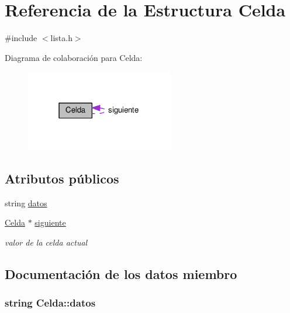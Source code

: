 \hypertarget{struct_celda}{}\section{Referencia de la Estructura Celda}
\label{struct_celda}


{\ttfamily \#include $<$lista.\+h$>$}



Diagrama de colaboración para Celda\+:
\nopagebreak
\begin{figure}[H]
\begin{center}
\leavevmode
\includegraphics[width=183pt]{struct_celda__coll__graph}
\end{center}
\end{figure}
\subsection*{Atributos públicos}
\begin{DoxyCompactItemize}
\item 
string \hyperlink{struct_celda_aef12ed8e6d15d140a516c259cdcbf634}{datos}
\item 
\hyperlink{struct_celda}{Celda} $\ast$ \hyperlink{struct_celda_a5c6d6d20b0c0b0a359715844955a0078}{siguiente}
\begin{DoxyCompactList}\small\item\em valor de la celda actual \end{DoxyCompactList}\end{DoxyCompactItemize}


\subsection{Documentación de los datos miembro}
\hypertarget{struct_celda_aef12ed8e6d15d140a516c259cdcbf634}{}
\subsubsection[{datos}]{\setlength{\rightskip}{0pt plus 5cm}string Celda\+::datos}\label{struct_celda_aef12ed8e6d15d140a516c259cdcbf634}
\hypertarget{struct_celda_a5c6d6d20b0c0b0a359715844955a0078}{}

